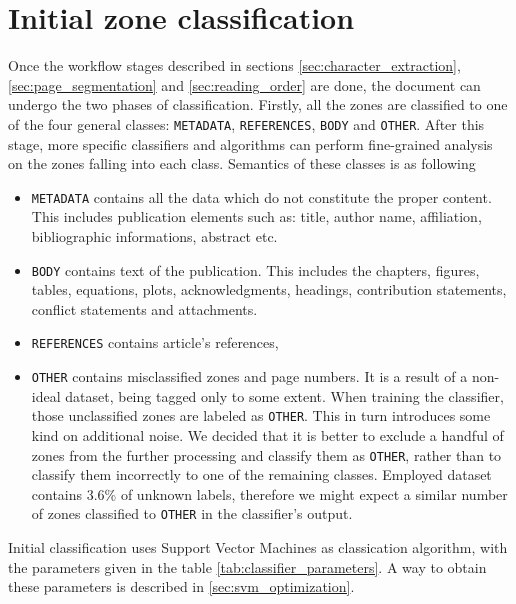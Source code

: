 \section{Initial zone classification}
Once the workflow stages described in sections \ref{sec:character_extraction}, \ref{sec:page_segmentation} and \ref{sec:reading_order} are done, the document can undergo the two phases of classification. Firstly, all the zones are classified to one of the four general classes: \verb+METADATA+, \verb+REFERENCES+, \verb+BODY+ and \verb+OTHER+. After this stage, more specific classifiers and algorithms can perform fine-grained analysis on the zones falling into each class. Semantics of these classes is as following
\begin{itemize}
\item \verb+METADATA+ contains all the data which do not constitute the proper content. This includes publication elements such as: title, author name, affiliation, bibliographic informations, abstract etc.
\item \verb+BODY+ contains text of the publication. This includes the chapters, figures, tables, equations, plots, acknowledgments, headings, contribution statements, conflict statements and attachments.
\item \verb+REFERENCES+ contains article's references,
\item \verb+OTHER+ contains misclassified zones and page numbers. It is a result of a non-ideal dataset, being tagged only to some extent. When training the classifier, those unclassified zones are labeled as \verb+OTHER+. This in turn introduces some kind on additional noise. We decided that it is better to exclude a handful of zones from the further processing and classify them as \verb+OTHER+, rather than to classify them incorrectly to one of the remaining classes. Employed dataset contains 3.6\% of unknown labels, therefore we might expect a similar number of zones classified to \verb+OTHER+ in the classifier's output.
\end{itemize}
\quad
Initial classification uses Support Vector Machines as classication algorithm, with the parameters given in the table \ref{tab:classifier_parameters}. A way to obtain these parameters is described in \ref{sec:svm_optimization}.

